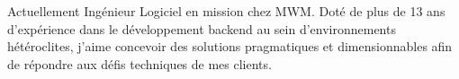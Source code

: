 

\begin{cvparagraph}

Actuellement Ingénieur Logiciel en mission chez MWM. \newline Doté de plus de 13 ans
d'expérience dans le développement backend au sein d'environnements hétéroclites, j'aime
concevoir des solutions pragmatiques et dimensionnables afin de répondre aux défis techniques de mes clients.
\end{cvparagraph}
